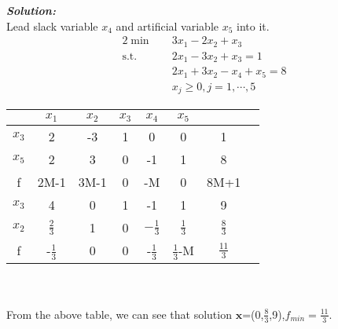 \documentclass[paper=a4, fontsize=11pt]{scrartcl} %
\numberwithin{equation}{section} %
\numberwithin{figure}{section} %
\numberwithin{table}{section} %
\begin{document}
\begin{enumerate}
\emph{\textbf{Solution:}}\\
Lead slack variable $x_4$ and artificial variable $x_5$ into it.
\begin{alignat}{2}          \nonumber
\min\quad & 3x_1-2x_2+x_3\\    \nonumber
\mbox{s.t.}\quad            \nonumber
& 2x_1-3x_2+x_3 = 1\\        \nonumber
& 2x_1+3x_2-x_4+x_5 = 8\\         \nonumber
& x_j\geq0, j=1,\cdots,5
\end{alignat}

\begin{tabular}{|c|c|c|c|c|c|c|c|}
\hline &$x_1$&$x_2$&$x_3$&$x_4$&$x_5$&\\
\hline$x_3$&2&-3&1&0&0&1\\
$x_5$&2&\Large{\textcircled{\small{3}}}&0&-1&1&8\\
\hline f&2M-1&3M-1&0&-M&0&8M+1\\
\hline
\hline $x_3$&4 & 0 & 1 & -1& 1 & 9\\
$x_2$&$\frac{2}{3}$& 1 & 0 &$-\frac{1}{3}$&$\frac{1}{3}$&$\frac{8}{3}$\\
\hline f   &-$\frac{1}{3}$& 0 & 0 & -$\frac{1}{3}$&$\frac{1}{3}$-M&$\frac{11}{3}$\\
\hline
\end{tabular}
\\\\
From the above table, we can see that solution $\mathbf{x}$=(0,$\frac{8}{3}$,9),$f_{min}=\frac{11}{3}$.

\end{enumerate}
\end{document}
